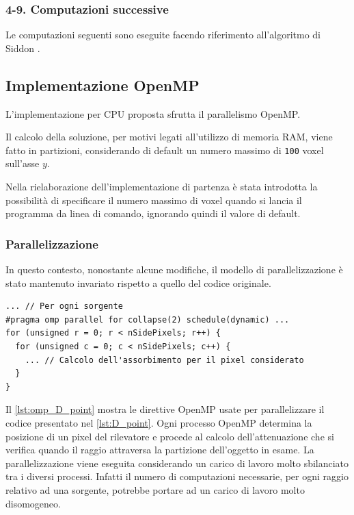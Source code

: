 \documentclass[12pt,a4paper]{report}
\begin{document}
\subsubsection{4-9. Computazioni successive}

Le computazioni seguenti sono eseguite facendo riferimento all'algoritmo di Siddon \cite{Siddon1984}.

\subsection{Implementazione OpenMP}

L'implementazione per CPU proposta sfrutta il parallelismo OpenMP.

Il calcolo della soluzione, per motivi legati all'utilizzo di memoria RAM, viene fatto in partizioni, considerando di default un
numero massimo di \lstinline{100} voxel sull'asse \(y\).

Nella rielaborazione dell'implementazione di partenza è stata introdotta la possibilità di specificare il numero massimo di voxel
quando si lancia il programma da linea di comando, ignorando quindi il valore di default.

\subsubsection{Parallelizzazione}

In questo contesto, nonostante alcune modifiche, il modello di parallelizzazione è stato mantenuto invariato rispetto a quello del
codice originale.

\begin{lstlisting}[language=CStyle, caption={Codice C per il calcolo dell'assorbimento di un determinato pixel del rilevatore.}, label={lst:omp_D_point}]
... // Per ogni sorgente
#pragma omp parallel for collapse(2) schedule(dynamic) ...
for (unsigned r = 0; r < nSidePixels; r++) {
  for (unsigned c = 0; c < nSidePixels; c++) {
    ... // Calcolo dell'assorbimento per il pixel considerato
  }
}
\end{lstlisting}

Il \autoref{lst:omp_D_point} mostra le direttive OpenMP usate per parallelizzare il codice presentato nel \autoref{lst:D_point}.
Ogni processo OpenMP determina la posizione di un pixel del rilevatore e procede al calcolo dell'attenuazione che si verifica
quando il raggio attraversa la partizione dell'oggetto in esame.
La parallelizzazione viene eseguita considerando un carico di lavoro molto sbilanciato tra i diversi processi.
Infatti il numero di computazioni necessarie, per ogni raggio relativo ad una sorgente, potrebbe portare ad un carico di lavoro
molto disomogeneo.
\end{document}
